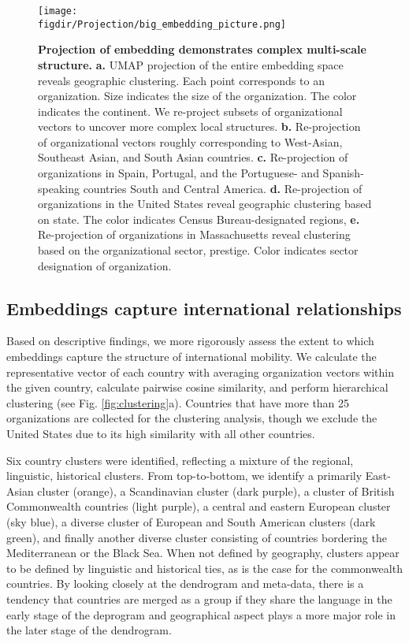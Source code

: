 \documentclass[12pt]{article} %
\def\figdir{../Figs}
\begin{document}
\begin{figure}[hp!]
    \centering
    \label{fig:projection}
    \texttt{[image: \\figdir/Projection/big\_embedding\_picture.png]}
    \caption{
        \textbf{Projection of embedding demonstrates complex multi-scale structure.}
        \textbf{a.}
        UMAP projection \autocite{mcinnes2018umap} of the entire embedding space reveals geographic clustering.
        Each point corresponds to an organization. 
        Size indicates the size of the organization.
        The color indicates the continent. 
        We re-project subsets of organizational vectors to uncover more complex local structures.
        \textbf{b.} Re-projection of organizational vectors roughly corresponding to West-Asian, Southeast Asian, and South Asian countries. 
        \textbf{c.} Re-projection of organizations in Spain, Portugal, and the Portuguese- and Spanish-speaking countries South and Central America. 
        \textbf{d.} Re-projection of organizations in the United States reveal geographic clustering based on state.
        The color indicates Census Bureau-designated regions,
        \textbf{e.} Re-projection of organizations in Massachusetts reveal clustering based on the organizational sector, prestige. 
        Color indicates sector designation of organization. 
    }
\end{figure}


\subsection*{Embeddings capture international relationships}

Based on descriptive findings, we more rigorously assess the extent to which embeddings capture the structure of international mobility. 
We calculate the representative vector of each country with averaging organization vectors within the given country, calculate pairwise cosine similarity, and perform hierarchical clustering (see Fig. \ref{fig:clustering}a).
Countries that have more than 25 organizations are collected for the clustering analysis, though we exclude the United States due to its high similarity with all other countries.

Six country clusters were identified, reflecting a mixture of the regional, linguistic, historical clusters. 
From top-to-bottom, we identify a primarily East-Asian cluster (orange), a Scandinavian cluster (dark purple), a cluster of British Commonwealth countries (light purple), a central and eastern European cluster (sky blue), a diverse cluster of European and South American clusters (dark green), and finally another diverse cluster consisting of countries bordering the Mediterranean or the Black Sea.
When not defined by geography, clusters appear to be defined by linguistic and historical ties, as is the case for the commonwealth countries. 
By looking closely at the dendrogram and meta-data, there is a tendency that countries are merged as a group if they share the language in the early stage of the deprogram and geographical aspect plays a more major role in the later stage of the dendrogram.
\end{document}
